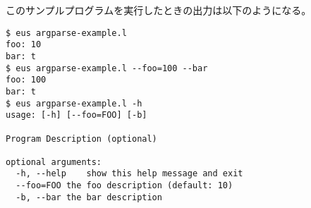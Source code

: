 \begin{refdesc}
このサンプルプログラムを実行したときの出力は以下のようになる。

\begin{verbatim}
$ eus argparse-example.l
foo: 10
bar: t
$ eus argparse-example.l --foo=100 --bar
foo: 100
bar: t
$ eus argparse-example.l -h
usage: [-h] [--foo=FOO] [-b]

Program Description (optional)

optional arguments:
  -h, --help	show this help message and exit
  --foo=FOO	the foo description (default: 10)
  -b, --bar	the bar description
\end{verbatim}

\end{refdesc}
